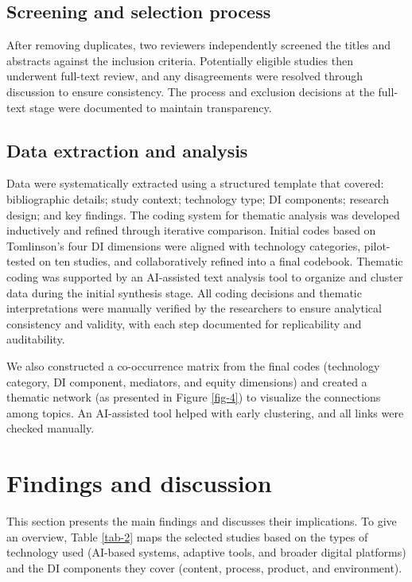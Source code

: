 \documentclass[english]{textolivre}
\begin{document}
\subsection{Screening and selection process}
After removing duplicates, two reviewers independently screened the titles and abstracts against the inclusion criteria. Potentially eligible studies then underwent full-text review, and any disagreements were resolved through discussion to ensure consistency. The process and exclusion decisions at the full-text stage were documented to maintain transparency.

\subsection{Data extraction and analysis}
Data were systematically extracted using a structured template that covered: bibliographic details; study context; technology type; DI components; research design; and key findings. The coding system for thematic analysis was developed inductively and refined through iterative comparison. Initial codes based on Tomlinson’s \citeyear{tomlinson1999} four DI dimensions were aligned with technology categories, pilot-tested on ten studies, and collaboratively refined into a final codebook. Thematic coding was supported by an AI-assisted text analysis tool to organize and cluster data during the initial synthesis stage. All coding decisions and thematic interpretations were manually verified by the researchers to ensure analytical consistency and validity, with each step documented for replicability and auditability.

We also constructed a co-occurrence matrix from the final codes (technology category, DI component, mediators, and equity dimensions) and created a thematic network (as presented in Figure \ref{fig-4}) to visualize the connections among topics. An AI-assisted tool helped with early clustering, and all links were checked manually.

\section{Findings and discussion}
This section presents the main findings and discusses their implications. To give an overview, Table \ref{tab-2} maps the selected studies based on the types of technology used (AI-based systems, adaptive tools, and broader digital platforms) and the DI components they cover (content, process, product, and environment).
\end{document}

